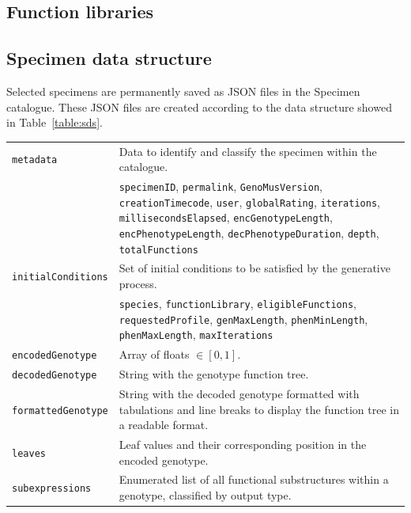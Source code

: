 \documentclass{article}
\begin{document}
\subsection{Function libraries}



\subsection{Specimen data structure}

Selected specimens are permanently saved as JSON files in the Specimen catalogue. These JSON files are created according to the data structure showed in Table~\ref{table:sds}.

\begin{table}[ht]
{\normalsize \begingroup
\setlength{\tabcolsep}{7pt} %
\renewcommand{\arraystretch}{1.8} %
\begin{tabular}{p{3.3cm} p{12.2cm}}
\toprule
\texttt{metadata} & Data to identify and classify the specimen within the catalogue.\\
 & {\small \texttt{specimenID}, \texttt{permalink}, \texttt{GenoMusVersion}, \texttt{creationTimecode}, \texttt{user}, \texttt{globalRating}, \texttt{iterations}, \texttt{millisecondsElapsed}, \texttt{encGenotypeLength}, \texttt{encPhenotypeLength}, \texttt{decPhenotypeDuration}, \texttt{depth}, \texttt{totalFunctions}}\\\hline
\texttt{initialConditions} & Set of initial conditions to be satisfied by the generative process.\\
 & {\small \texttt{species}, \texttt{functionLibrary}, \texttt{eligibleFunctions}, \texttt{requestedProfile}, \texttt{genMaxLength}, \texttt{phenMinLength}, \texttt{phenMaxLength}, \texttt{maxIterations}}\\\hline
\texttt{encodedGenotype} & Array of floats $\in [0, 1]$.\\\hline
\texttt{decodedGenotype} & String with the genotype function tree.\\\hline
\texttt{formattedGenotype} & String with the decoded genotype formatted with tabulations and line breaks to display the function tree in a readable format.\\\hline
\texttt{leaves} & Leaf values and their corresponding position in the encoded genotype.\\\hline
\texttt{subexpressions} & Enumerated list of all functional substructures within a genotype, classified by output type.\\\hline

\end{tabular}}
\end{table}
\end{document}
